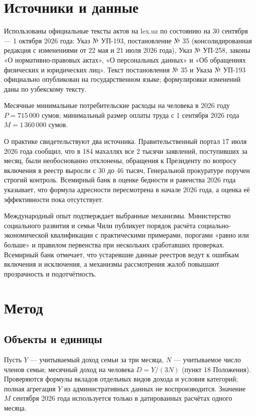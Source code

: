 \documentclass[12pt,a4paper]{extarticle}
\begin{document}
\section{Источники и данные}
Использованы официальные тексты актов на lex.uz по состоянию на 30 сентября — 1 октября 2026 года: Указ № УП-193, постановление № 35 (консолидированная редакция с изменениями от 22 мая и 21 июля 2026 года), Указ № УП-258, законы «О нормативно-правовых актах», «О персональных данных» и «Об обращениях физических и юридических лиц»\cite{ref1,ref2,ref3,ref7,ref9,ref20}. Текст постановления № 35 и Указа № УП-193 официально опубликован на государственном языке; формулировки изменений даны по узбекскому тексту.

Месячные минимальные потребительские расходы на человека в 2026 году $P=715\,000$ сумов\cite{ref5}; минимальный размер оплаты труда с 1 сентября 2026 года $M=1\,360\,000$ сумов\cite{ref4}.

О практике свидетельствуют два источника. Правительственный портал 17 июля 2026 года сообщил, что в 184 махаллях все 2 тысячи заявлений, поступивших за месяц, были необоснованно отклонены, обращения к Президенту по вопросу включения в реестр выросли с 30 до 46 тысяч, Генеральной прокуратуре поручен строгий контроль\cite{ref28}. Всемирный банк в оценке бедности и равенства 2026 года указывает, что формула адресности пересмотрена в начале 2026 года, а оценка её эффективности пока отсутствует\cite{ref11}.

Международный опыт подтверждает выбранные механизмы. Министерство социального развития и семьи Чили публикует порядок расчёта социально-экономической квалификации с практическими примерами, порогами «равно или больше» и правилом первенства при нескольких сработавших проверках\cite{ref32}. Всемирный банк отмечает, что устаревшие данные реестров ведут к ошибкам включения и исключения, а механизмы рассмотрения жалоб повышают прозрачность и подотчётность\cite{ref12}.

\section{Метод}
\subsection{Объекты и единицы}
Пусть $Y$ — учитываемый доход семьи за три месяца, $N$ — учитываемое число членов семьи; месячный доход на человека $D=Y/(3N)$ (пункт 18 Положения). Проверяются формулы вкладов отдельных видов дохода и условия категорий; полная агрегация $Y$ из административных данных не воспроизводится. Значение $M$ сентября 2026 года используется только в датированных расчётах одного месяца.
\end{document}
